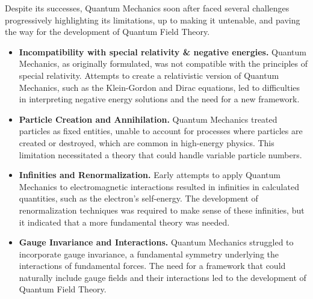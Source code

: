 \documentclass[../QFT_main.tex]{subfiles}
\begin{document}
\begin{mytheorem}
Despite its successes, Quantum Mechanics soon after faced several challenges progressively highlighting its limitations, up to making it untenable, and paving the way for the development of Quantum Field Theory.
%
\begin{itemize}
    \item \textbf{Incompatibility with special relativity \& negative energies.} Quantum Mechanics, as originally formulated, was not compatible with the principles of special relativity.
    Attempts to create a relativistic version of Quantum Mechanics, such as the Klein-Gordon and Dirac equations, led to difficulties in interpreting negative energy solutions and the need for a new framework.
    \item \textbf{Particle Creation and Annihilation.} Quantum Mechanics treated particles as fixed entities, unable to account for processes where particles are created or destroyed, which are common in high-energy physics.
    This limitation necessitated a theory that could handle variable particle numbers.
    \item \textbf{Infinities and Renormalization.} Early attempts to apply Quantum Mechanics to electromagnetic interactions resulted in infinities in calculated quantities, such as the electron's self-energy.
    The development of renormalization techniques was required to make sense of these infinities, but it indicated that a more fundamental theory was needed.
    \item \textbf{Gauge Invariance and Interactions.} Quantum Mechanics struggled to incorporate gauge invariance, a fundamental symmetry underlying the interactions of fundamental forces.
    The need for a framework that could naturally include gauge fields and their interactions led to the development of Quantum Field Theory.
\end{itemize}
\end{mytheorem}
\end{document}
